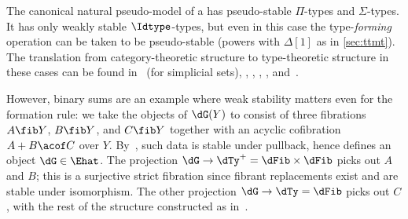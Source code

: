 \begin{eg}
  The canonical natural pseudo-model of a \ttmt has pseudo-stable $\Pi$-types and $\Sigma$-types.
  It has only weakly stable $\Idtype$-types, but even in this case the type-\emph{forming} operation can be taken to be pseudo-stable (powers with $\Delta[1]$ as in \cref{sec:ttmt}).
  The translation from category-theoretic structure to type-theoretic structure in these cases can be found in~\cite[ and Proposition 2.3.3]{klv:ssetmodel} (for simplicial sets), \cite[Theorem 3.1]{aw:htpy-idtype}, \cite[Theorem 2.17]{warren:thesis}, \cite[Theorem 26]{ak:htmtt}, \cite[Theorem 4.2.2]{lw:localuniv}, and~\cite[]{awodey:natmodels}.

  However, binary sums are an example where weak stability matters even for the formation rule: we take the objects of $\dG(Y)$ to consist of three fibrations $A\fib Y$, $B\fib Y$, and $C\fib Y$ together with an acyclic cofibration $A+B \acof C$ over $Y$.
  By~\cite[Theorem 3.3]{ls:hits}, such data is stable under pullback, hence defines an object $\dG\in\Ehat$.
  The projection $\dG \to \dTy^{+} = \dFib\times \dFib$ picks out $A$ and $B$; this is a surjective strict fibration since fibrant replacements exist and are stable under isomorphism.
  The other projection $\dG \to \dTy= \dFib$ picks out $C$, with the rest of the structure constructed as in~\cite[Theorem 3.3]{ls:hits}.
\end{eg}

